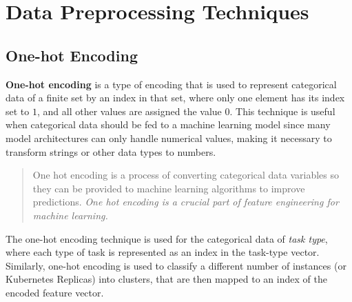 
\section{Data Preprocessing Techniques}
\label{sec:data-preprocessing-techniques}
  \subsection{One-hot Encoding}
  \label{sec:one-hot-encoding-preprocessing-architecture}

    \textbf{One-hot encoding} \cite{fawcettDataScienceMinutes} is a type of encoding that is used to represent categorical data of a finite set by an index in that set, where only one element has its index set to $1$, and all other values are assigned the value $0$.
    This technique is useful when categorical data should be fed to a machine learning model since many model architectures can only handle numerical values, making it necessary to transform strings or other data types to numbers.
  \begin{quote}
    One hot encoding is a process of converting categorical data variables so they can be provided to machine learning algorithms to improve predictions. \emph{One hot encoding is a crucial part of feature engineering for machine learning.} \cite{fawcettDataScienceMinutes}
  \end{quote}
  The one-hot encoding technique is used for the categorical data of \emph{task type}, where each type of task is represented as an index in the task-type vector. Similarly, one-hot encoding is used to classify a different number of instances (or Kubernetes Replicas) into clusters, that are then mapped to an index of the encoded feature vector.
  
